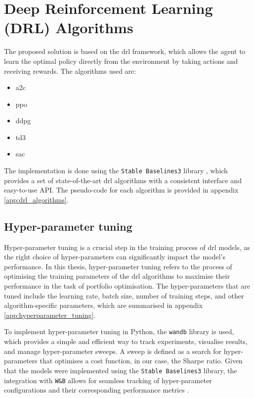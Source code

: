 \section{Deep Reinforcement Learning (DRL) Algorithms} \label{sec:drl-algorithms}

The proposed solution is based on the \acrshort{drl} framework, which allows the agent to learn the optimal policy directly from the environment by taking actions and receiving rewards. The algorithms used are:
\begin{itemize}
    \item \acrfull{a2c}
    \item \acrfull{ppo}
    \item \acrfull{ddpg}
    \item \acrfull{td3}
    \item \acrfull{sac}
\end{itemize}

The implementation is done using the \texttt{Stable Baselines3} library \cite{Raffin2021}, which provides a set of state-of-the-art \acrshort{drl} algorithms with a consistent interface and easy-to-use API. The pseudo-code for each algorithm is provided in appendix \ref{app:drl_algorithms}.

\subsection{Hyper-parameter tuning} \label{subsec:hyperparameter-tuning}

Hyper-parameter tuning is a crucial step in the training process of \acrshort{drl} models, as the right choice of hyper-parameters can significantly impact the model's performance. In this thesis, hyper-parameter tuning refers to the process of optimising the training parameters of the \acrshort{drl} algorithms to maximise their performance in the task of portfolio optimisation. The hyper-parameters that are tuned include the learning rate, batch size, number of training steps, and other algorithm-specific parameters, which are summarised in appendix \ref{app:hyperparameter_tuning}. 

To implement hyper-parameter tuning in Python, the \texttt{wandb} \cite{wandb} library is used, which provides a simple and efficient way to track experiments, visualise results, and manage hyper-parameter sweeps. A sweep is defined as a search for hyper-parameters that optimises a cost function, in our case, the Sharpe ratio. Given that the models were implemented using the \texttt{Stable Baselines3} library, the integration with \texttt{W\&B} allows for seamless tracking of hyper-parameter configurations and their corresponding performance metrics \cite{WeightsBiases2025}. 

